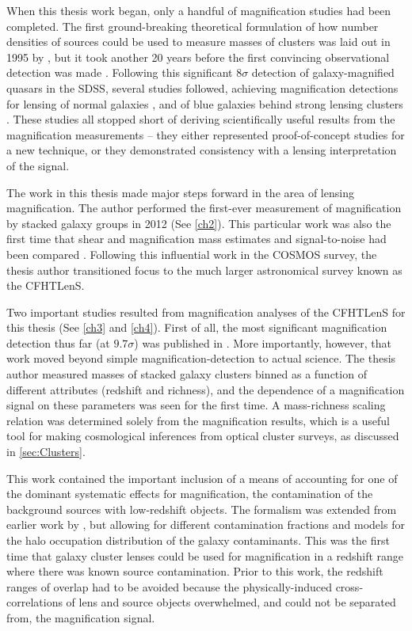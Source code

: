 When this thesis work began, only a handful of magnification studies had been completed. The first ground-breaking theoretical formulation of how number densities of sources could be used to measure masses of clusters was laid out in 1995 by \citet{Broadhurst95}, but it took another 20 years before the first convincing observational detection was made \citep{Scranton05}. Following this significant $8\sigma$ detection of galaxy-magnified quasars in the \ac{SDSS}, several studies followed, achieving magnification detections for lensing of normal galaxies \citep{Hildebrandt09b}, and of blue galaxies behind strong lensing clusters \citep{Umetsu11}. These studies all stopped short of deriving scientifically useful results from the magnification measurements -- they either represented proof-of-concept studies for a new technique, or they demonstrated consistency with a lensing interpretation of the signal.

The work in this thesis made major steps forward in the area of lensing magnification. The author performed the first-ever measurement of magnification by stacked galaxy groups in 2012 (See \autoref{ch2}). This particular work was also the first time that shear and magnification mass estimates and signal-to-noise had been compared \citep{Ford12}. Following this influential work in the \acf{COSMOS} survey, the thesis author transitioned focus to the much larger astronomical survey known as the \acf{CFHTLenS}. 

Two important studies resulted from magnification analyses of the \ac{CFHTLenS} for this thesis (See \autoref{ch3} and \autoref{ch4}). First of all, the most significant magnification detection thus far (at $9.7\sigma$) was published in \citet{Ford14}. More importantly, however, that work moved beyond simple magnification-detection to actual science. The thesis author measured masses of stacked galaxy clusters binned as a function of different attributes (redshift and richness), and the dependence of a magnification signal on these parameters was seen for the first time. A mass-richness scaling relation was determined solely from the magnification results, which is a useful tool for making cosmological inferences from optical cluster surveys, as discussed in \autoref{sec:Clusters}. 

This work contained the important inclusion of a means of accounting for one of the dominant systematic effects for magnification, the contamination of the background sources with low-redshift objects. The formalism was extended from earlier work by \citet{Hildebrandt13}, but allowing for different contamination fractions and models for the halo occupation distribution of the galaxy contaminants. This was the first time that galaxy cluster lenses could be used for magnification in a redshift range where there was known source contamination. Prior to this work, the redshift ranges of overlap had to be avoided because the physically-induced cross-correlations of lens and source objects overwhelmed, and could not be separated from, the magnification signal.

